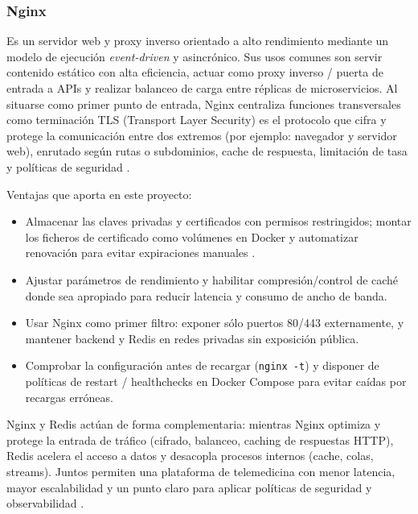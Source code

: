 \documentclass[12pt, a4paper]{article}
\begin{document}
\subsubsection{Nginx}
 Es un servidor web y proxy inverso orientado a alto rendimiento mediante un modelo de ejecución \emph{event-driven} y asincrónico. Sus usos comunes son servir contenido estático con alta eficiencia, actuar como proxy inverso / puerta de entrada a APIs y realizar balanceo de carga entre réplicas de microservicios. Al situarse como primer punto de entrada, Nginx centraliza funciones transversales como terminación TLS (Transport Layer Security) es el protocolo que cifra y protege la comunicación entre dos extremos (por ejemplo: navegador y servidor web), enrutado según rutas o subdominios, cache de respuesta, limitación de tasa y políticas de seguridad \cite{nginx_reverseproxy,nginx_docs}.


Ventajas que aporta en este proyecto:
\begin{itemize}
	\item Almacenar las claves privadas y certificados con permisos restringidos; montar los ficheros de certificado como volúmenes en Docker y automatizar renovación para evitar expiraciones manuales \cite{certbot_doc}.
	\item Ajustar parámetros de rendimiento y habilitar compresión/control de caché donde sea apropiado para reducir latencia y consumo de ancho de banda.
	\item Usar Nginx como primer filtro: exponer sólo puertos 80/443 externamente, y mantener backend y Redis en redes privadas sin exposición pública.
	\item Comprobar la configuración antes de recargar (\texttt{nginx -t}) y disponer de políticas de restart / healthchecks en Docker Compose para evitar caídas por recargas erróneas.
\end{itemize}

Nginx y Redis actúan de forma complementaria: mientras Nginx optimiza y protege la entrada de tráfico (cifrado, balanceo, caching de respuestas HTTP), Redis acelera el acceso a datos y desacopla procesos internos (cache, colas, streams). Juntos permiten una plataforma de telemedicina con menor latencia, mayor escalabilidad y un punto claro para aplicar políticas de seguridad y observabilidad \cite{nginx_reverseproxy,nginx_loadbalancer,redis_pubsub}.
\end{document}
